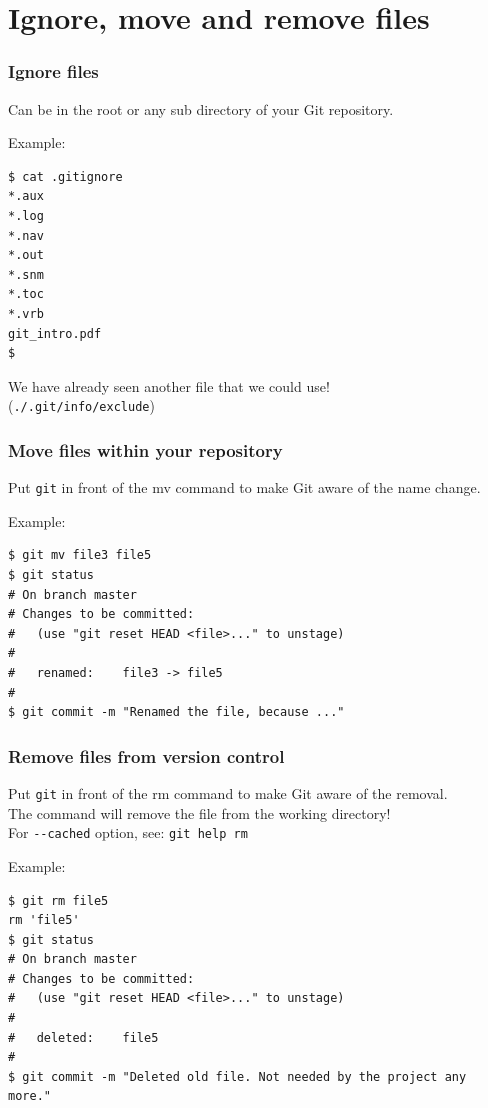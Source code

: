 \documentclass{gittalk}
\newcommand{\hlcommand}[1]{ %
\colorbox{base3}{\small \texttt{#1}}
}
\begin{document}
\section{Ignore, move and remove files}

\begin{frame}[fragile]
\frametitle{Ignore files}
\begin{tcolorbox}[title=The .gitignore file]
Can be in the root or any sub directory of your Git repository.
\end{tcolorbox}
\vspace*{0.5em}
Example:
\begin{lstlisting}
$ cat .gitignore
*.aux
*.log
*.nav
*.out
*.snm
*.toc
*.vrb
git_intro.pdf
$
\end{lstlisting}
\vspace*{0.5em}
We have already seen another file that we could use!\\
(\texttt{./.git/info/exclude})
\end{frame}

\begin{frame}[fragile]
\frametitle{Move files within your repository}
\begin{tcolorbox}[title=git mv]
Put \texttt{git} in front of the mv command to make Git aware of the name change.
\end{tcolorbox}
\vspace*{0.5em}
Example:
\begin{lstlisting}
$ git mv file3 file5
$ git status
# On branch master
# Changes to be committed:
#   (use "git reset HEAD <file>..." to unstage)
#
#	renamed:    file3 -> file5
#
$ git commit -m "Renamed the file, because ..."
\end{lstlisting}
\end{frame}

\begin{frame}[fragile]
\frametitle{Remove files from version control}
\begin{tcolorbox}[title=git rm]
Put \texttt{git} in front of the rm command to make Git aware of the removal.\\[0.5em]
The command will remove the file from the working directory!\\
For \hlcommand{-{}-cached} option, see: \hlcommand{git help rm} 
\end{tcolorbox}
Example:
\begin{lstlisting}
$ git rm file5
rm 'file5'
$ git status
# On branch master
# Changes to be committed:
#   (use "git reset HEAD <file>..." to unstage)
#
#	deleted:    file5
#
$ git commit -m "Deleted old file. Not needed by the project any more."

\end{lstlisting}
\end{frame}
\end{document}
